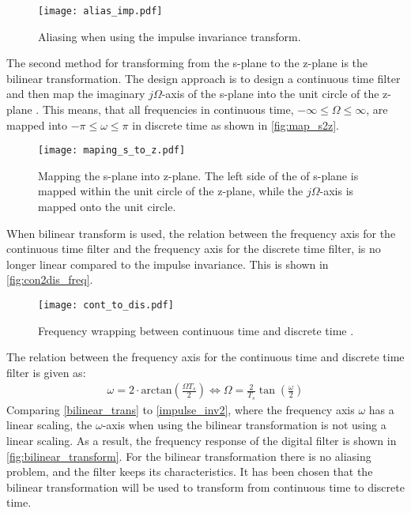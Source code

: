 \begin{figure}[H]
    \centering
    \texttt{[image: alias\_imp.pdf]}
    \caption{Aliasing when using the impulse invariance transform.}
    \label{fig:aliasing}
\end{figure} 
The second method for transforming from the s-plane to the z-plane is the bilinear transformation. The design approach is to design a continuous time filter and then map the imaginary $j\Omega$-axis of the s-plane into the unit circle of the z-plane \citep[p. 528]{oppenheim}. This means, that all frequencies in continuous time, $-\infty \le \Omega \le \infty$, are mapped into $-\pi \le \omega \le \pi$ in discrete time as shown in \autoref{fig:map_s2z}.
\begin{figure}[H]
    \centering
    \texttt{[image: maping\_s\_to\_z.pdf]}
    \caption{Mapping the s-plane into z-plane\citep[p.528]{oppenheim}. The left side of the of s-plane is mapped within the unit circle of the z-plane, while the $j\Omega$-axis is mapped onto the unit circle.}
    \label{fig:map_s2z}
\end{figure} 
When bilinear transform is used, the relation between the frequency axis for the continuous time filter and the frequency axis for the discrete time filter, is no longer linear compared to the impulse invariance. This is shown in \autoref{fig:con2dis_freq}.
\begin{figure}[H]
    \centering
    \texttt{[image: cont\_to\_dis.pdf]}
    \caption{Frequency wrapping between continuous time and discrete time \citep[p.530]{oppenheim}.}
    \label{fig:con2dis_freq}
\end{figure} 
The relation between the frequency axis for the continuous time and discrete time filter is given as:
\begin{align}
\omega = 2\cdot \text{arctan}(\frac{\Omega T_s}{2}) \Leftrightarrow \Omega = \frac{2}{T_s}\tan (\frac{\omega}{2})
\label{bilinear_trans}
\end{align}
Comparing \autoref{bilinear_trans} to \autoref{impulse_inv2}, where the frequency axis $\omega$ has a linear scaling, the $\omega$-axis when using the bilinear transformation is not using a linear scaling. As a result, the frequency response of the digital filter is shown in \autoref{fig:bilinear_transform}. For the bilinear transformation there is no aliasing problem, and the filter keeps its characteristics. It has been chosen that the bilinear transformation will be used to transform from continuous time to discrete time.

